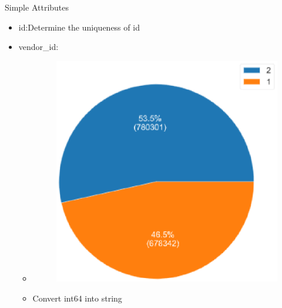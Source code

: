 \documentclass[
 size=14pt,
 paper=smartboard,  %
 mode=present, 		%
 display=slides, 	%
 style=tuliplab,  	%
 pauseslide,
 fleqn,leqno]{powerdot}
\begin{document}
\begin{slide}{Simple Attributes}
  \begin{itemize}
    \item id:Determine the uniqueness of id
    \item vendor_id:
    \begin{itemize}
      \item\begin{figure}\includegraphics[scale=0.4]{figures/three.eps}\end{figure}
    \end{itemize}
    \begin{itemize}
      \item Convert int64 into string
    \end{itemize}
  \end{itemize}
\end{slide}
\end{document}
